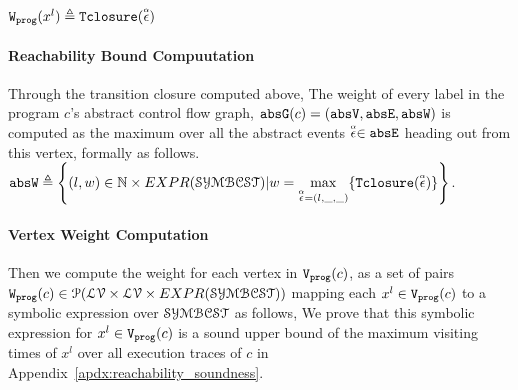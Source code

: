 $
\mathtt{{W_{prog}}}(x^l) 
  \triangleq {\ensuremath{\mathtt{Tclosure}}}(\stackrel{\scriptscriptstyle{\alpha}}{\mathtt{\epsilon}{}})
$
\paragraph*{Reachability Bound Compuutation}
Through the transition closure computed above, 
The weight of every label in 
the program $c$'s abstract control flow graph,
$\mathtt{abs}{\mathtt{G}}(c) =(\mathtt{abs}{\mathtt{V}}, \mathtt{abs}{\mathtt{E}}, \mathtt{abs}{\mathtt{W}})$
is 
computed as the maximum over all the abstract events $\stackrel{\scriptscriptstyle{\alpha}}{\mathtt{\epsilon}{}} \in \mathtt{abs}{\mathtt{E}}$ heading out from this vertex, formally as follows.
\\
$\absW 
\triangleq \left\{ (l, w) \in \mathbb{N} \times EXPR(\constdom) | w = \max\limits_{\absevent = (l, \_, \_)} \{ \absclr(\absevent)\} \right\}$.
\paragraph{Vertex Weight Computation}
Then we compute the weight for each vertex in $\mathtt{{V_{prog}}}(c)$,
as a set of pairs $\mathtt{{W_{prog}}}(c) \in \mathcal{P}(\mathcal{LV} \times \mathcal{LV} \times EXPR(\mathcal{SYMBCST}))$ 
mapping each $x^l \in \mathtt{{V_{prog}}}(c)$ to a symbolic expression over $\mathcal{SYMBCST}$
as follows,
%
We prove that this 
symbolic expression for $x^l \in \mathtt{{V_{prog}}}(c)$ is a sound upper bound of 
the maximum visiting times of $x^l$ over all execution traces of $c$ in Appendix~\ref{apdx:reachability_soundness}. 
%





